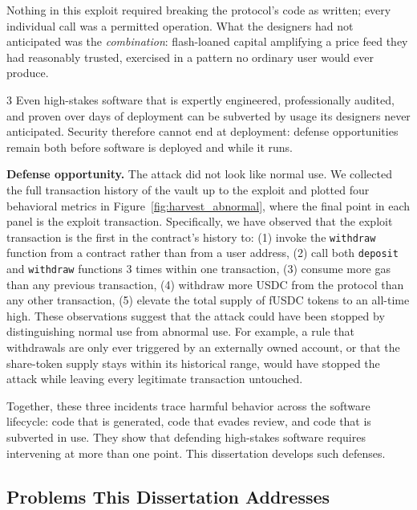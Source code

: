 Nothing in this exploit required breaking the protocol's code as
written; every individual call was a permitted operation. What the designers had
not anticipated was the \emph{combination}: flash-loaned capital amplifying a
price feed they had reasonably trusted, exercised in a pattern no ordinary user
would ever produce.

\begin{finding}{3}
Even high-stakes software that is expertly engineered, professionally
audited, and proven over days of deployment can be subverted by usage its
designers never anticipated. Security therefore cannot end at deployment:
defense opportunities remain both before software is deployed and
while it runs.
\end{finding}



\noindent \textbf{Defense opportunity.} The attack did not look like normal use.
We collected the full transaction history of the vault up to the exploit and
plotted four behavioral 
metrics in Figure~\ref{fig:harvest_abnormal}, where the
final point in each panel is the exploit transaction. 
Specifically, we have observed that the exploit transaction is the
first in the contract's history to: (1) invoke the
\texttt{withdraw} function from a contract 
rather than from a user address, 
(2) call both \texttt{deposit} and
\texttt{withdraw} functions $3$ times within one transaction, 
(3)
consume more gas than any previous transaction, 
(4) withdraw more USDC from the
protocol than any other transaction, 
(5) elevate the total supply of fUSDC
tokens to an all-time high. 
These observations suggest that the attack could have been stopped by distinguishing 
normal use from abnormal use.
For example, a rule that withdrawals
are only ever triggered by an externally owned account, or that the share-token
supply stays within its historical range, would have stopped the attack while
leaving every legitimate transaction untouched.

Together, these three incidents trace harmful behavior across the software
lifecycle: code that is generated, code that evades review, and code that
is subverted in use. They show that defending high-stakes software requires
intervening at more than one point. This dissertation develops such defenses.


\subsection{Problems This Dissertation Addresses}

